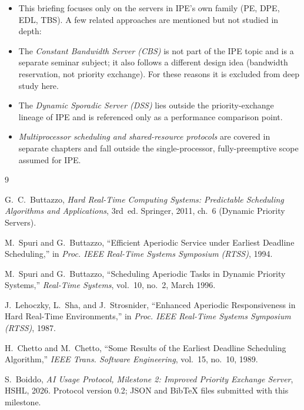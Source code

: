 \documentclass[conference]{IEEEtran}
\begin{document}
\begin{itemize}
  \item This briefing focuses only on the servers in IPE's own family (PE, DPE,
        EDL, TBS). A few related approaches are mentioned but not studied in
        depth:
  \item The \emph{Constant Bandwidth Server (CBS)} is not part of the IPE topic
        and is a separate seminar subject; it also follows a different design
        idea (bandwidth reservation, not priority exchange). For these reasons
        it is excluded from deep study here.
  \item The \emph{Dynamic Sporadic Server (DSS)} lies outside the
        priority-exchange lineage of IPE and is referenced only as a
        performance comparison point.
  \item \emph{Multiprocessor scheduling and shared-resource protocols} are
        covered in separate chapters and fall outside the single-processor,
        fully-preemptive scope assumed for IPE.
\end{itemize}


\begin{thebibliography}{9}

G.~C.~Buttazzo,
\textit{Hard Real-Time Computing Systems: Predictable Scheduling Algorithms
and Applications}, 3rd~ed.
Springer, 2011, ch.~6 (Dynamic Priority Servers).

M.~Spuri and G.~Buttazzo,
``Efficient Aperiodic Service under Earliest Deadline Scheduling,''
in \textit{Proc. IEEE Real-Time Systems Symposium (RTSS)}, 1994.

M.~Spuri and G.~Buttazzo,
``Scheduling Aperiodic Tasks in Dynamic Priority Systems,''
\textit{Real-Time Systems}, vol.~10, no.~2, March 1996.

J.~Lehoczky, L.~Sha, and J.~Strosnider,
``Enhanced Aperiodic Responsiveness in Hard Real-Time Environments,''
in \textit{Proc. IEEE Real-Time Systems Symposium (RTSS)}, 1987.

H.~Chetto and M.~Chetto,
``Some Results of the Earliest Deadline Scheduling Algorithm,''
\textit{IEEE Trans. Software Engineering}, vol.~15, no.~10, 1989.

S.~Boiddo,
\textit{AI Usage Protocol, Milestone 2: Improved Priority Exchange Server},
HSHL, 2026. Protocol version 0.2; JSON and BibTeX files submitted with this
milestone.

\end{thebibliography}
\end{document}
